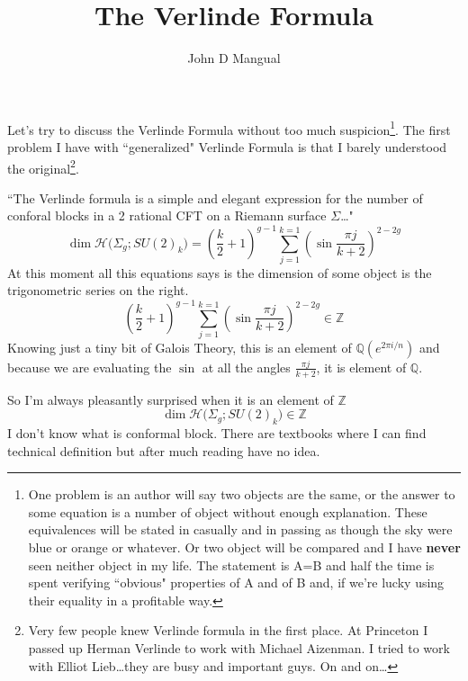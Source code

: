 \documentclass[12pt]{article}
\title{\textbf{ The Verlinde Formula }}
\author{John D Mangual}
\date{}
\begin{document}
\selectfont \fontsize{25}{30}\selectfont

\maketitle


\noindent Let's try to discuss the Verlinde Formula without too much suspicion\footnote{One problem is an author will say two objects are the same, or the answer to some equation is a number of object without enough explanation.  These equivalences will be stated in casually and in passing as though the sky were blue or orange or whatever.  Or two object will be compared and I have \textbf{never} seen neither object in my life.  The statement is A=B and half the time is spent verifying ``obvious" properties of A and of B and, if we're lucky using their equality in a profitable way.}.  The first problem I have with ``generalized" Verlinde Formula is that I barely understood the original\footnote{Very few people knew Verlinde formula in the first place.  At Princeton I passed up Herman Verlinde to work with Michael Aizenman.  I tried to work with Elliot Lieb\dots they are busy and important guys.  On and on\dots}. \newline

\noindent ``The Verlinde formula is a simple and elegant expression for the number of conforal blocks in a 2 rational CFT on a Riemann surface $\Sigma$\dots"
$$ \dim \mathcal{H}\big( \Sigma_g; SU(2)_k \big) 
= \left( \frac{k}{2}+1 \right)^{g-1}
\sum_{j=1}^{k=1} \left( \sin \frac{\pi j}{k+2} \right)^{2-2g}
$$
At this moment all this equations says is the dimension of some object is the trigonometric series on the right.
$$ \left( \frac{k}{2}+1 \right)^{g-1}
\sum_{j=1}^{k=1} \left( \sin \frac{\pi j}{k+2} \right)^{2-2g} \in \mathbb{Z} $$
Knowing just a tiny bit of Galois Theory, this is an element of $\mathbb{Q}(e^{2\pi i / n})$ and because we are evaluating the $\sin$ at all the angles $\frac{\pi j}{k+2}$, it is element of $\mathbb{Q}$. \newline

\noindent So I'm always pleasantly surprised when it is an element of $\mathbb{Z}$
$$ \dim \mathcal{H}\big( \Sigma_g; SU(2)_k \big)  \in \mathbb{Z} $$
I don't know what is conformal block.  There are textbooks where I can find technical definition but after much reading have no idea.
\newpage
\end{document}
